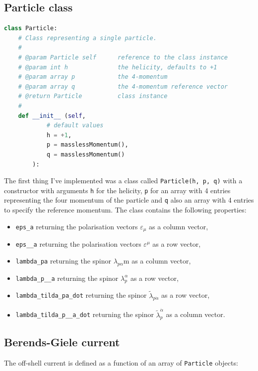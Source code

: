 \documentclass{article}
\theoremstyle{definition}
\def\code#1{\texttt{#1}}
\numberwithin{equation}{section}
\begin{document}
\subsection{Particle class}

\begin{lstlisting}[language=Python, caption=Particle class definiton]
class Particle:
    # Class representing a single particle.
    #
    # @param Particle self      reference to the class instance
    # @param int h              the helicity, defaults to +1
    # @param array p            the 4-momentum
    # @param array q            the 4-momentum reference vector
    # @return Particle          class instance
    #
    def __init__ (self,
            # default values
            h = +1,
            p = masslessMomentum(),
            q = masslessMomentum()
        ):
\end{lstlisting}

The first thing I've implemented was a class called \code{Particle(h, p, q)} with a constructor with arguments \code{h} for the helicity, \code{p} for an array with 4 entries representing the four momentum of the particle and \code{q} also an array with 4 entries to specify the reference momentum. The class contains the following properties:

\begin{itemize}
  \item \code{eps\_a} returning the polarisation vectors $\varepsilon_{\mu}$ as a column vector,
  \item \code{eps\_\_a} returning the polarisation vectors $\varepsilon^{\mu}$ as a row vector,
  \item \code{lambda\_pa} returning the spinor $\lambda_{p \alpha}$m as a column vector,
  \item \code{lambda\_p\_\_a} returning the spinor $\lambda_p^{\alpha}$ as a row vector,
  \item \code{lambda\_tilda\_pa\_dot} returning the spinor $\tilde{\lambda}_{p \dot{\alpha}}$ as a row vector,
  \item \code{lambda\_tilda\_p\_\_a\_dot} returning the spinor $\tilde{\lambda}_{p}^{\dot{\alpha}}$ as a column vector.
\end{itemize}

\subsection{Berends-Giele current}

The off-shell current is defined as a function of an array of \code{Particle} objects:
\end{document}
